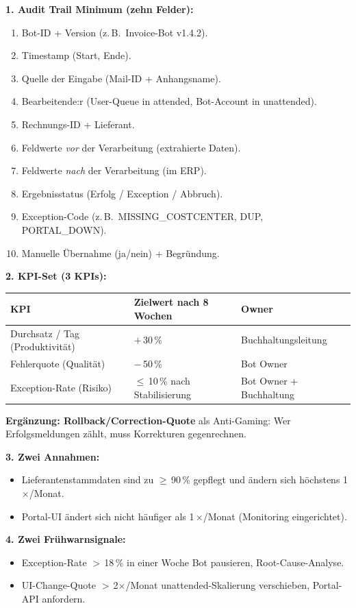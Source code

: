 \documentclass[11pt,a4paper,oneside]{article}
\begin{document}
\begin{loesungbox}
\textbf{1. Audit Trail Minimum (zehn Felder):}
\begin{enumerate}
  \item Bot-ID + Version (z.\,B.\ Invoice-Bot v1.4.2).
  \item Timestamp (Start, Ende).
  \item Quelle der Eingabe (Mail-ID + Anhangsname).
  \item Bearbeitende:r (User-Queue in attended, Bot-Account in unattended).
  \item Rechnungs-ID + Lieferant.
  \item Feldwerte \emph{vor} der Verarbeitung (extrahierte Daten).
  \item Feldwerte \emph{nach} der Verarbeitung (im ERP).
  \item Ergebnisstatus (Erfolg / Exception / Abbruch).
  \item Exception-Code (z.\,B.\ MISSING\_COSTCENTER, DUP, PORTAL\_DOWN).
  \item Manuelle \"Ubernahme (ja/nein) + Begr\"undung.
\end{enumerate}

\smallskip
\textbf{2. KPI-Set (3 KPIs):}

\smallskip
\begin{tabularx}{\linewidth}{@{}p{3.4cm}p{2.6cm}X@{}}
\toprule
\textbf{KPI} & \textbf{Zielwert nach 8 Wochen} & \textbf{Owner} \\
\midrule
Durchsatz / Tag (Produktivit\"at) & $+$\,30\,\% & Buchhaltungsleitung \\
Fehlerquote (Qualit\"at)           & $-$\,50\,\%        & Bot Owner \\
Exception-Rate (Risiko)            & $\leq$\,10\,\% nach Stabilisierung & Bot Owner + Buchhaltung \\
\bottomrule
\end{tabularx}

\smallskip
\textbf{Erg\"anzung: Rollback/Correction-Quote} als Anti-Gaming: Wer Erfolgsmeldungen z\"ahlt, muss Korrekturen gegenrechnen.

\smallskip
\textbf{3. Zwei Annahmen:}
\begin{itemize}
  \item Lieferantenstammdaten sind zu $\geq$\,90\,\% gepflegt und \"andern sich h\"ochstens 1\,$\times$/Monat.
  \item Portal-UI \"andert sich nicht h\"aufiger als 1\,$\times$/Monat (Monitoring eingerichtet).
\end{itemize}

\smallskip
\textbf{4. Zwei Fr\"uhwarnsignale:}
\begin{itemize}
  \item Exception-Rate $>$\,18\,\% in einer Woche \textrightarrow{} Bot pausieren, Root-Cause-Analyse.
  \item UI-Change-Quote $>$\,2$\times$/Monat \textrightarrow{} unattended-Skalierung verschieben, Portal-API anfordern.
\end{itemize}
\end{loesungbox}
\end{document}
